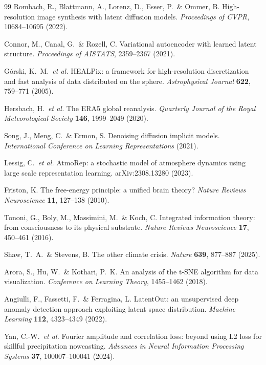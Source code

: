 \documentclass[11pt,a4paper]{article}
\theoremstyle{plain}
\theoremstyle{definition}
\theoremstyle{remark}
\begin{document}
\begin{thebibliography}{99}
Rombach, R., Blattmann, A., Lorenz, D., Esser, P.\ \& Ommer, B.
High-resolution image synthesis with latent diffusion models.
\textit{Proceedings of CVPR}, 10684--10695 (2022).

Connor, M., Canal, G.\ \& Rozell, C.
Variational autoencoder with learned latent structure.
\textit{Proceedings of AISTATS}, 2359--2367 (2021).

G\'{o}rski, K.~M.\ \textit{et al.}
HEALPix: a framework for high-resolution discretization and fast analysis of
data distributed on the sphere.
\textit{Astrophysical Journal} \textbf{622}, 759--771 (2005).

Hersbach, H.\ \textit{et al.}
The ERA5 global reanalysis.
\textit{Quarterly Journal of the Royal Meteorological Society}
\textbf{146}, 1999--2049 (2020).

Song, J., Meng, C.\ \& Ermon, S.
Denoising diffusion implicit models.
\textit{International Conference on Learning Representations} (2021).

Lessig, C.\ \textit{et al.}
AtmoRep: a stochastic model of atmosphere dynamics using large scale
representation learning.
arXiv:2308.13280 (2023).

Friston, K.
The free-energy principle: a unified brain theory?
\textit{Nature Reviews Neuroscience} \textbf{11}, 127--138 (2010).

Tononi, G., Boly, M., Massimini, M.\ \& Koch, C.
Integrated information theory: from consciousness to its physical substrate.
\textit{Nature Reviews Neuroscience} \textbf{17}, 450--461 (2016).

Shaw, T.~A.\ \& Stevens, B.
The other climate crisis.
\textit{Nature} \textbf{639}, 877--887 (2025).

Arora, S., Hu, W.\ \& Kothari, P.~K.
An analysis of the t-SNE algorithm for data visualization.
\textit{Conference on Learning Theory}, 1455--1462 (2018).

Angiulli, F., Fassetti, F.\ \& Ferragina, L.
LatentOut: an unsupervised deep anomaly detection approach exploiting latent
space distribution.
\textit{Machine Learning} \textbf{112}, 4323--4349 (2022).

Yan, C.-W.\ \textit{et al.}
Fourier amplitude and correlation loss: beyond using L2 loss for skillful
precipitation nowcasting.
\textit{Advances in Neural Information Processing Systems} \textbf{37},
100007--100041 (2024).


\end{thebibliography}
\end{document}
